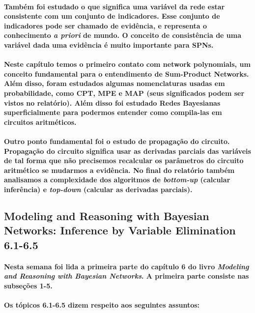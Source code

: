 \documentclass[a4paper,10pt]{article}
\theoremstyle{plain}
\begin{document}
\paragraph{
  Também foi estudado o que significa uma variável da rede estar consistente com um conjunto de
  indicadores. Esse conjunto de indicadores pode ser chamado de evidência, e representa o
  conhecimento \textit{a priori} de mundo. O conceito de consistência de uma variável dada uma
  evidência é muito importante para SPNs.
}

\paragraph{
  Neste capítulo temos o primeiro contato com network polynomials, um conceito fundamental para o
  entendimento de Sum-Product Networks. Além disso, foram estudados algumas nomenclaturas usadas
  em probabilidade, como CPT, MPE e MAP (seus significados podem ser vistos no relatório). Além
  disso foi estudado Redes Bayesianas superficialmente para podermos entender como compila-las em
  circuitos aritméticos.
}

\paragraph{
  Outro ponto fundamental foi o estudo de propagação do circuito. Propagação do circuito significa
  usar as derivadas parciais das variáveis de tal forma que não precisemos recalcular os parâmetros
  do circuito aritmético se mudarmos a evidência. No final do relatório também analisamos a
  complexidade dos algoritmos de \textit{bottom-up} (calcular inferência) e \textit{top-down}
  (calcular as derivadas parciais).
}

\subsection{Modeling and Reasoning with Bayesian Networks: Inference by Variable Elimination 6.1-6.5}

\paragraph{
  Nesta semana foi lida a primeira parte do capítulo 6 do livro \textit{Modeling and Reasoning with
  Bayesian Networks}\cite{bayes-net-darwiche}. A primeira parte consiste nas subseções 1-5.
}

\paragraph{
  Os tópicos 6.1-6.5 dizem respeito aos seguintes assuntos:
}
\end{document}

